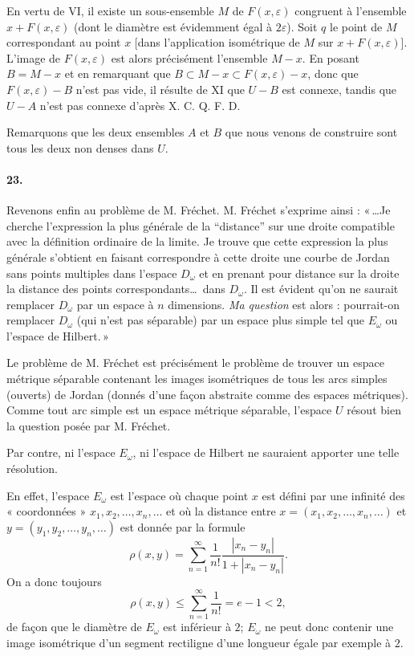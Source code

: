 \documentclass[a4paper,12pt]{amsart}
\newcommand{\srcpage}[1]{} %
\begin{document}
En vertu de VI, il existe un sous-ensemble $M$ de $F(x,\varepsilon)$ congruent à l'ensemble $x+F(x,\varepsilon)$ (dont le diamètre est évidemment égal à $2\varepsilon$). Soit $q$ le point de $M$ correspondant au point $x$ [dans l'application isométrique de $M$ sur $x+F(x,\varepsilon)$]. L'image de $F(x,\varepsilon)$ est alors précisément l'ensemble $M-x$. En posant $B=M-x$ et en remarquant que $B\subset M-x\subset F(x,\varepsilon)-x$, donc que $F(x,\varepsilon)-B$ n'est pas vide, il résulte de XI que $U-B$ est connexe, tandis que $U-A$ n'est pas connexe d'après X. \hfill C. Q. F. D.

Remarquons que les deux ensembles $A$ et $B$ que nous venons de construire sont tous les deux non denses dans $U$.

\srcpage{88}
\paragraph{23.}
Revenons enfin au problème de M. Fréchet. M. Fréchet s'exprime ainsi : «\,\ldots Je cherche l'expression la plus générale de la “distance” sur une droite compatible avec la définition ordinaire de la limite. Je trouve que cette expression la plus générale s'obtient en faisant correspondre à cette droite une courbe de Jordan sans points multiples dans l'espace $D_\omega$ et en prenant pour distance sur la droite la distance des points correspondants\ldots\ dans $D_\omega$. Il est évident qu'on ne saurait remplacer $D_\omega$ par un espace à $n$ dimensions. \textit{Ma question} est alors : pourrait-on remplacer $D_\omega$ (qui n'est pas séparable) par un espace plus simple tel que $E_\omega$ ou l'espace de Hilbert.\,»

Le problème de M. Fréchet est précisément le problème de trouver un espace métrique séparable contenant les images isométriques de tous les arcs simples (ouverts) de Jordan (donnés d'une façon abstraite comme des espaces métriques). Comme tout arc simple est un espace métrique séparable, l'espace $U$ résout bien la question posée par M. Fréchet.

Par contre, ni l'espace $E_\omega$, ni l'espace de Hilbert ne sauraient apporter une telle résolution.

En effet, l'espace $E_\omega$ est l'espace où chaque point $x$ est défini par une infinité des « coordonnées » $x_1,x_2,\ldots,x_n,\ldots$ et où la distance entre $x=(x_1,x_2,\ldots,x_n,\ldots)$ et $y=(y_1,y_2,\ldots,y_n,\ldots)$ est donnée par la formule
\[\rho(x,y)=\sum_{n=1}^{\infty}\frac1{n!}\frac{|x_n-y_n|}{1+|x_n-y_n|}.\]
On a donc toujours
\[\rho(x,y)\le\sum_{n=1}^{\infty}\frac1{n!}=e-1<2,\]
de façon que le diamètre de $E_\omega$ est inférieur à $2$; $E_\omega$ ne peut donc contenir une image isométrique d'un segment rectiligne d'une longueur égale par exemple à $2$.
\end{document}
